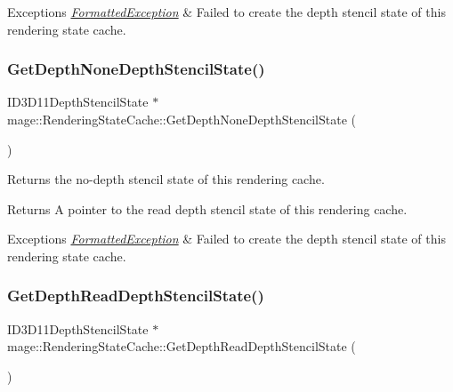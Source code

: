 \begin{DoxyExceptions}{Exceptions}
{\em \hyperlink{structmage_1_1_formatted_exception}{Formatted\+Exception}} & Failed to create the depth stencil state of this rendering state cache. \\
\hline
\end{DoxyExceptions}
\hypertarget{structmage_1_1_rendering_state_cache_a5885a7c2a375bcb37d2139e04e162ecd}{}\label{structmage_1_1_rendering_state_cache_a5885a7c2a375bcb37d2139e04e162ecd} 
\subsubsection{\texorpdfstring{Get\+Depth\+None\+Depth\+Stencil\+State()}{GetDepthNoneDepthStencilState()}}
{\footnotesize\ttfamily I\+D3\+D11\+Depth\+Stencil\+State $\ast$ mage\+::\+Rendering\+State\+Cache\+::\+Get\+Depth\+None\+Depth\+Stencil\+State (\begin{DoxyParamCaption}{ }\end{DoxyParamCaption})}

Returns the no-\/depth stencil state of this rendering cache.

\begin{DoxyReturn}{Returns}
A pointer to the read depth stencil state of this rendering cache. 
\end{DoxyReturn}

\begin{DoxyExceptions}{Exceptions}
{\em \hyperlink{structmage_1_1_formatted_exception}{Formatted\+Exception}} & Failed to create the depth stencil state of this rendering state cache. \\
\hline
\end{DoxyExceptions}
\hypertarget{structmage_1_1_rendering_state_cache_adca5a3b2a24505f4c8bcad07ff1d3d42}{}\label{structmage_1_1_rendering_state_cache_adca5a3b2a24505f4c8bcad07ff1d3d42} 
\subsubsection{\texorpdfstring{Get\+Depth\+Read\+Depth\+Stencil\+State()}{GetDepthReadDepthStencilState()}}
{\footnotesize\ttfamily I\+D3\+D11\+Depth\+Stencil\+State $\ast$ mage\+::\+Rendering\+State\+Cache\+::\+Get\+Depth\+Read\+Depth\+Stencil\+State (\begin{DoxyParamCaption}{ }\end{DoxyParamCaption})}


